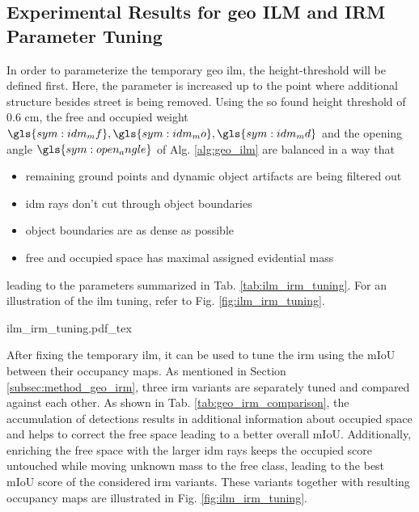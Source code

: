 \subsection{Experimental Results for geo ILM and IRM Parameter Tuning}
\label{subsec:exp_results_params_ilm_irm}
In order to parameterize the temporary geo \gls{ilm}, the height-threshold will be defined first. Here, the parameter is increased up to the point where additional structure besides street is being removed. Using the so found height threshold of 0.6 cm, the free and occupied weight $\gls{sym:idm_mf}, \gls{sym:idm_mo}, \gls{sym:idm_md}$ and the opening angle $\gls{sym:open_angle}$ of Alg. \ref{alg:geo_ilm} are balanced in a way that 
\begin{itemize}[noitemsep,nolistsep]
	\item remaining ground points and dynamic object artifacts are being filtered out
	\item \gls{idm} rays don't cut through object boundaries
	\item object boundaries are as dense as possible
	\item free and occupied space has maximal assigned evidential mass
\end{itemize}
leading to the parameters summarized in Tab. \ref{tab:ilm_irm_tuning}. For an illustration of the \gls{ilm} tuning, refer to Fig. \ref{fig:ilm_irm_tuning}.
\begin{center}
	{ilm_irm_tuning.pdf_tex}
\end{center}
After fixing the temporary \gls{ilm}, it can be used to tune the \gls{irm} using the mIoU between their occupancy maps. As mentioned in Section \ref{subsec:method_geo_irm}, three \gls{irm} variants are separately tuned and compared against each other. As shown in Tab. \ref{tab:geo_irm_comparison}, the accumulation of detections results in additional information about occupied space and helps to correct the free space leading to a better overall mIoU. Additionally, enriching the free space with the larger \gls{idm} rays keeps the occupied score untouched while moving unknown mass to the free class, leading to the best mIoU score of the considered \gls{irm} variants. These variants together with resulting occupancy maps are illustrated in Fig. \ref{fig:ilm_irm_tuning}.

